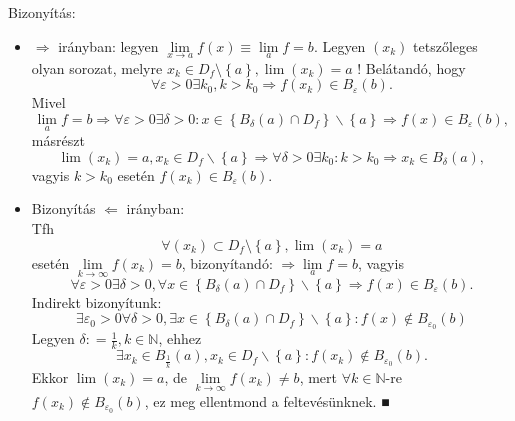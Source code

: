 \documentclass[12pt,a4paper]{scrartcl}
\providecommand{\tightlist}{%
  \setlength{\itemsep}{0pt}\setlength{\parskip}{0pt}}
\newenvironment{bizonyitas}{}{}
\begin{document}
\begin{bizonyitas}

Bizonyítás:

\begin{itemize}
\tightlist
\item
  \(\Rightarrow\) irányban: legyen
  \(\underset{x\rightarrow a}{\lim}f\left( x \right) \equiv \underset{a}{\lim}f = b\).
  Legyen \(\left( x_{k} \right)\) tetszőleges olyan sorozat, melyre
  \(x_{k} \in D_{f}\text{\textbackslash}\left\{ a \right\},\lim\left( x_{k} \right) = a\)
  ! Belátandó, hogy
  \[\left. \forall\varepsilon > 0\exists k_{0},k > k_{0}\Rightarrow f\left( x_{k} \right) \in B_{\varepsilon}{\left( b \right).} \right.\]
  Mivel
  \[\left. \lim\limits_{a}f = b\Rightarrow\forall\varepsilon > 0\exists\delta > 0:x \in \left\{ {B_{\delta}\left( a \right) \cap D_{f}} \right\}\backslash\left\{ a \right\}\Rightarrow f\left( x \right) \in B_{\varepsilon}{\left( b \right),} \right.\]
  másrészt
  \[\left. \lim\left( x_{k} \right) = a,x_{k} \in D_{f}\backslash\left\{ a \right\}\Rightarrow\forall\delta > 0\exists k_{0}:k > k_{0}\Rightarrow x_{k} \in B_{\delta}{\left( a \right),} \right.\]
  vagyis \(k > k_{0}\) esetén
  \(f\left( x_{k} \right) \in B_{\varepsilon}\left( b \right)\).
\item
  Bizonyítás \(\Leftarrow\) irányban:\\
  Tfh
  \[\forall\left( x_{k} \right) \subset D_{f}\text{\textbackslash}\left\{ a \right\},\lim\left( x_{k} \right) = a\]
  esetén
  \(\underset{k\rightarrow\infty}{\lim}f\left( x_{k} \right) = b\),
  bizonyítandó: \(\left. \Rightarrow\underset{a}{\lim}f = b \right.\),
  vagyis
  \[\left. \forall\varepsilon > 0\exists\delta > 0,\forall x \in \left\{ {B_{\delta}\left( a \right) \cap D_{f}} \right\}\backslash\left\{ a \right\}\Rightarrow f\left( x \right) \in B_{\varepsilon}{\left( b \right).} \right.\]
  Indirekt bizonyítunk:
  \[\exists\varepsilon_{0} > 0\forall\delta > 0,\exists x \in \left\{ {B_{\delta}\left( a \right) \cap D_{f}} \right\}\backslash\left\{ a \right\}:f\left( x \right) \notin B_{\varepsilon_{0}}\left( b \right)\]
  Legyen \(\delta: = \frac{1}{k},k \in {\mathbb{N}}\), ehhez
  \[\exists x_{k} \in B_{\frac{1}{k}}\left( a \right),x_{k} \in D_{f}\backslash\left\{ a \right\}:f\left( x_{k} \right) \notin B_{\varepsilon_{0}}{\left( b \right).}\]
  Ekkor \(\lim\left( x_{k} \right) = a\), de
  \(\underset{k\rightarrow\infty}{\lim}f\left( x_{k} \right) \neq b\),
  mert \(\forall k \in {\mathbb{N}}\)-re
  \(f\left( x_{k} \right) \notin B_{\varepsilon_{0}}\left( b \right)\),
  ez meg ellentmond a feltevésünknek. ■
\end{itemize}

\end{bizonyitas}
\end{document}
